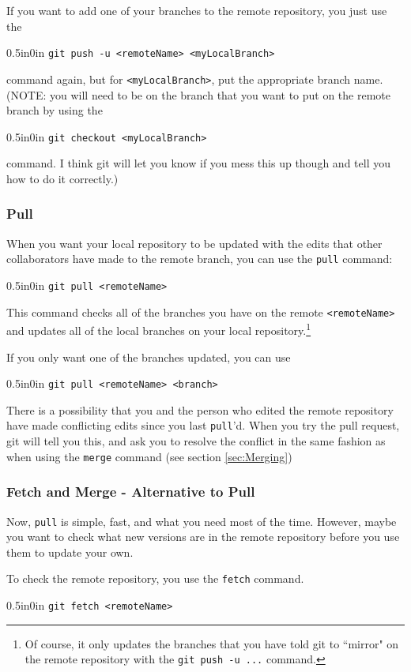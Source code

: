 \documentclass[11pt]{article}
\newcommand{\code}[1]{\begin{adjustwidth}{0.5in}{0in}
    \texttt{#1}
    \end{adjustwidth}}
\begin{document}
If you want to add one of your branches to the remote repository, you just use the 

\code{git push -u <remoteName> <myLocalBranch>}  

command again, but for \texttt{<myLocalBranch>}, put the appropriate branch name.  (NOTE: you will need to be on the branch that you want to put on the remote branch by using the \code{git checkout <myLocalBranch>} command.  I think git will let you know if you mess this up though and tell you how to do it correctly.)

\subsubsection{Pull}

When you want your local repository to be updated with the edits that other collaborators have made to the remote branch, you can use the \texttt{pull} command:

\code{git pull <remoteName>}

This command checks all of the branches you have on the remote \texttt{<remoteName>} and updates all of the local branches on your local repository.\footnote{Of course, it only updates the branches that you have told git to ``mirror" on the remote repository with the \texttt{git push -u ...} command.}

If you only want one of the branches updated, you can use

\code{git pull <remoteName> <branch>}

There is a possibility that you and the person who edited the remote repository have made conflicting edits since you last \texttt{pull}'d.  When you try the pull request, git will tell you this, and ask you to resolve the conflict in the same fashion as when using the \texttt{merge} command (see section \ref{sec:Merging})

\subsubsection{Fetch and Merge - Alternative to Pull}

Now, \texttt{pull} is simple, fast, and what you need most of the time.  However, maybe you want to check what new versions are in the remote repository before you use them to update your own.  

To check the remote repository, you use the \texttt{fetch} command.

\code{git fetch <remoteName>}
\end{document}
